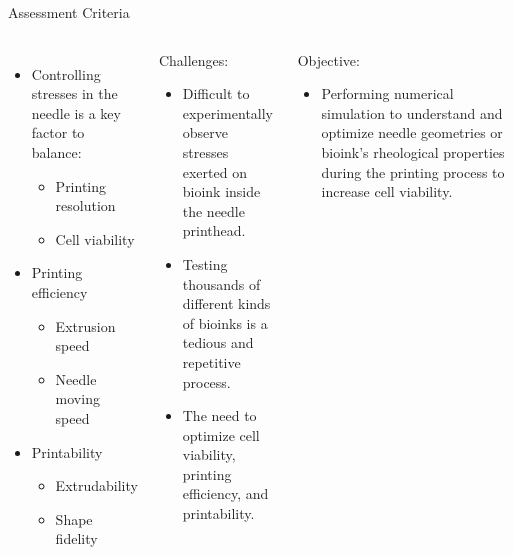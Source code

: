 \begin{frame}{Assessment Criteria}

\begin{columns}
\begin{itemize}
\setlength{\itemsep}{5mm}
\item Controlling stresses in the needle is a key factor to balance:
    \begin{itemize}
        \item Printing resolution
        \item Cell viability\footnotemark
    \end{itemize}
\item Printing efficiency
\begin{itemize}
    \item Extrusion speed
    \item Needle moving speed
\end{itemize}
\item Printability
    \begin{itemize}
        \item Extrudability
        \item Shape fidelity
    \end{itemize}
\end{itemize}

\begin{block}{Challenges:}
\begin{itemize}
    \item Difficult to experimentally observe stresses exerted on bioink inside the needle printhead.
    \item Testing thousands of different kinds of bioinks is a tedious and repetitive process.
    \item The need to optimize cell viability, printing efficiency, and printability.\footnotemark
\end{itemize}
\end{block}
\vspace{-3mm}
\begin{block}{Objective:}
\begin{itemize}
    \item Performing numerical simulation to understand and optimize needle geometries or bioink's rheological properties during the printing process to increase cell viability.
\end{itemize}
\end{block}
\end{columns}

\addtocounter{footnote}{-2}
\end{frame}


